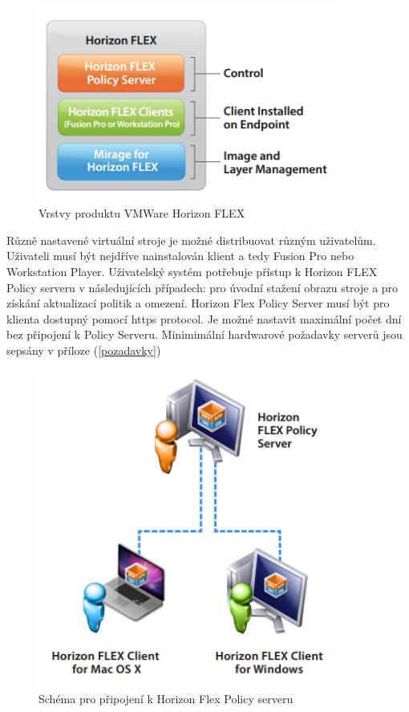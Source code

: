  \begin{figure}[h!]\label{FlexVrstvy}
\includegraphics[width=10cm]{img/FlexVrstvy}
\caption{Vrstvy produktu VMWare Horizon FLEX} 
\label{FlexVrstvy}
\centering
\end{figure}



Různě nastavené virtuální stroje je možné distribuovat různým uživatelům. Uživateli musí být nejdříve nainstalován klient a tedy Fusion Pro nebo Workstation Player. Uživatelský systém potřebuje přístup k Horizon FLEX Policy serveru v následujících případech: pro úvodní stažení obrazu stroje a pro získání aktualizací politik a omezení. Horizon Flex Policy Server musí být pro klienta dostupný pomocí https protocol. Je možné nastavit maximální počet dní bez připojení k Policy Serveru. Minimimální hardwarové požadavky serverů jsou sepsány v příloze (\ref{pozadavky})


 \begin{figure}[h!]\label{FlexPolicy}
\includegraphics[width=10cm]{img/FlexPolicy}
\caption{Schéma pro připojení k Horizon Flex Policy serveru}
\centering
\end{figure} 


